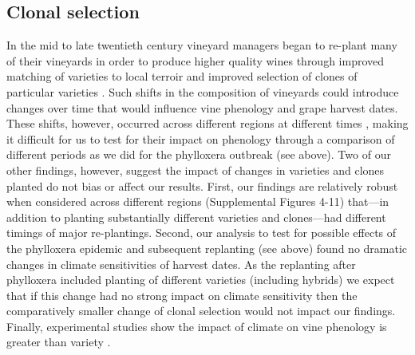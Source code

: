 \documentclass[12pt]{article}
\begin{document}
\subsection*{Clonal selection}
\noindent In the mid to late twentieth century vineyard managers began to re-plant many of their vineyards in order to produce higher quality wines through improved matching of varieties to local terroir and improved selection of clones of particular varieties \cite{Bouquet2002}. Such shifts in the composition of vineyards could introduce changes over time that would influence vine phenology and grape harvest dates. These shifts, however, occurred across different regions at different times \cite{Bouquet2002}, making it difficult for us to test for their impact on phenology through a comparison of different periods as we did for the phylloxera outbreak (see above). Two of our other findings, however, suggest the impact of changes in varieties and clones planted do not bias or affect our results. First, our findings are relatively robust when considered across different regions  (Supplemental Figures 4-11) that---in addition to planting substantially different varieties and clones---had different timings of major re-plantings. Second, our analysis to test for possible effects of the phylloxera epidemic and subsequent replanting (see above) found no dramatic changes in climate sensitivities of harvest dates. As the replanting after phylloxera included planting of different varieties (including hybrids) we expect that if this change had no strong impact on climate sensitivity then the comparatively smaller change of clonal selection would not impact our findings. Finally, experimental studies show the impact of climate on vine phenology is greater than variety \cite{vanleeuwen2004}.
\end{document}
